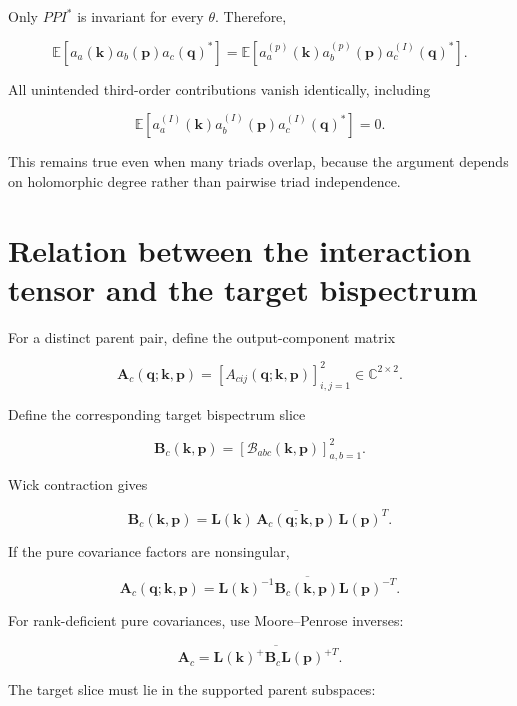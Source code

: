 \documentclass[
  11pt,
  a4paper,
]{article}
\begin{document}
Only \(PPI^*\) is invariant for every \(\theta\). Therefore,

\[
\boxed{
\mathbb E[
a_a(\boldsymbol k)
a_b(\boldsymbol p)
a_c(\boldsymbol q)^*
]
=
\mathbb E[
a_a^{(p)}(\boldsymbol k)
a_b^{(p)}(\boldsymbol p)
a_c^{(I)}(\boldsymbol q)^*
]
}.
\]

All unintended third-order contributions vanish identically, including

\[
\mathbb E[
a_a^{(I)}(\boldsymbol k)
a_b^{(I)}(\boldsymbol p)
a_c^{(I)}(\boldsymbol q)^*
]
=
0.
\]

This remains true even when many triads overlap, because the argument
depends on holomorphic degree rather than pairwise triad independence.

\section{Relation between the interaction tensor and the target
bispectrum}\label{relation-between-the-interaction-tensor-and-the-target-bispectrum}

For a distinct parent pair, define the output-component matrix

\[
\boldsymbol A_c(\boldsymbol q;\boldsymbol k,\boldsymbol p)
=
\left[
A_{cij}(\boldsymbol q;\boldsymbol k,\boldsymbol p)
\right]_{i,j=1}^{2}
\in\mathbb C^{2\times2}.
\]

Define the corresponding target bispectrum slice

\[
\boldsymbol B_c(\boldsymbol k,\boldsymbol p)
=
\left[
\mathcal B_{abc}(\boldsymbol k,\boldsymbol p)
\right]_{a,b=1}^{2}.
\]

Wick contraction gives

\[
\boxed{
\boldsymbol B_c(\boldsymbol k,\boldsymbol p)
=
\boldsymbol L(\boldsymbol k)\,
\overline{
\boldsymbol A_c(\boldsymbol q;\boldsymbol k,\boldsymbol p)
}
\,\boldsymbol L(\boldsymbol p)^T
}.
\]

If the pure covariance factors are nonsingular,

\[
\boxed{
\boldsymbol A_c(\boldsymbol q;\boldsymbol k,\boldsymbol p)
=
\overline{
\boldsymbol L(\boldsymbol k)^{-1}
\boldsymbol B_c(\boldsymbol k,\boldsymbol p)
\boldsymbol L(\boldsymbol p)^{-T}
}
}.
\]

For rank-deficient pure covariances, use Moore--Penrose inverses:

\[
\boxed{
\boldsymbol A_c
=
\overline{
\boldsymbol L(\boldsymbol k)^+
\boldsymbol B_c
\boldsymbol L(\boldsymbol p)^{+T}
}
}.
\]

The target slice must lie in the supported parent subspaces:
\end{document}

